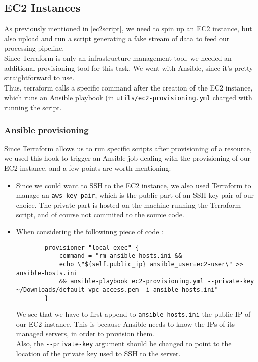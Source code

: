 \subsection{EC2 Instances}\label{ec2-tf}
As previously mentioned in \ref{ec2script}, we need to spin up an EC2 instance, but also upload and run a script generating a fake stream of data to feed our processing pipeline.\\
Since Terraform is only an infrastructure management tool, we needed an additional provisioning tool for this task. We went with Ansible, since it's pretty straightforward to use.\\
Thus, terraform calls a specific command after the creation of the EC2 instance, which runs an Ansible playbook (in \lstinline{utils/ec2-provisioning.yml} charged with running the script.
\subsubsection{Ansible provisioning}
Since Terraform allows us to run specific scripts after provisioning of a resource, we used this hook to trigger an Ansible job dealing with the provisioning of our EC2 instance, and a few points are worth mentioning:
\begin{itemize}
    \item Since we could want to SSH to the EC2 instance, we also used Terraform to manage an \lstinline{aws_key_pair}, which is the public part of an SSH key pair of our choice. The private part is hosted on the machine running the Terraform script, and of course not commited to the source code.
    \item   When considering the followinng piece of code : 
        \begin{lstlisting}
        provisioner "local-exec" {
            command = "rm ansible-hosts.ini && 
            echo \"${self.public_ip} ansible_user=ec2-user\" >> ansible-hosts.ini 
            && ansible-playbook ec2-provisioning.yml --private-key ~/Downloads/default-vpc-access.pem -i ansible-hosts.ini"
        }
        \end{lstlisting}
        We see that we have to first append to \lstinline{ansible-hosts.ini} the public IP of our EC2 instance. This is because Ansible needs to know the IPs of its managed servers, in order to provision them.\\
        Also, the \lstinline{--private-key} argument should be changed to point to the location of the private key used to SSH to the server.
\end{itemize}


